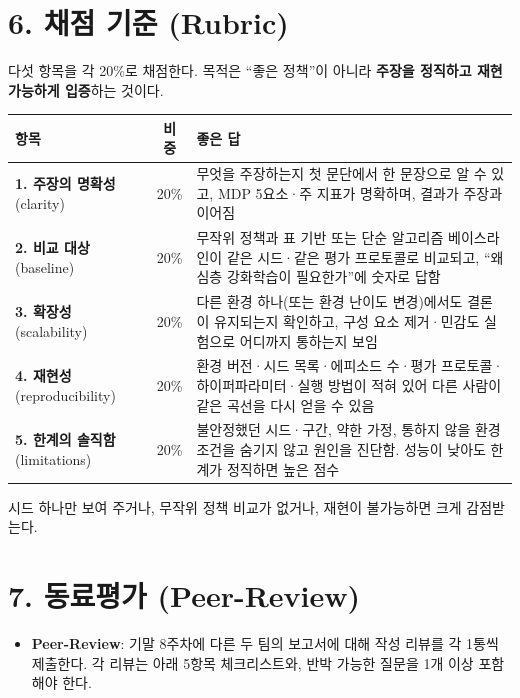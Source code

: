 \documentclass[12pt]{article}
\begin{document}
\section*{6. 채점 기준 (Rubric)}
다섯 항목을 각 20\%로 채점한다. 목적은 ``좋은 정책''이 아니라 \textbf{주장을 정직하고 재현 가능하게 입증}하는 것이다.
\begin{center}
\small
\begin{tabular}{@{}p{3.3cm}cp{7.4cm}@{}}
\toprule
항목 & 비중 & 좋은 답 \\
\midrule
\textbf{1. 주장의 명확성} (clarity) & 20\% & 무엇을 주장하는지 첫 문단에서 한 문장으로 알 수 있고, MDP 5요소·주 지표가 명확하며, 결과가 주장과 이어짐 \\
\textbf{2. 비교 대상} (baseline) & 20\% & 무작위 정책과 표 기반 또는 단순 알고리즘 베이스라인이 같은 시드·같은 평가 프로토콜로 비교되고, ``왜 심층 강화학습이 필요한가''에 숫자로 답함 \\
\textbf{3. 확장성} (scalability) & 20\% & 다른 환경 하나(또는 환경 난이도 변경)에서도 결론이 유지되는지 확인하고, 구성 요소 제거·민감도 실험으로 어디까지 통하는지 보임 \\
\textbf{4. 재현성} (reproducibility) & 20\% & 환경 버전·시드 목록·에피소드 수·평가 프로토콜·하이퍼파라미터·실행 방법이 적혀 있어 다른 사람이 같은 곡선을 다시 얻을 수 있음 \\
\textbf{5. 한계의 솔직함} (limitations) & 20\% & 불안정했던 시드·구간, 약한 가정, 통하지 않을 환경 조건을 숨기지 않고 원인을 진단함. 성능이 낮아도 한계가 정직하면 높은 점수 \\
\bottomrule
\end{tabular}
\end{center}
\vspace{4pt}
시드 하나만 보여 주거나, 무작위 정책 비교가 없거나, 재현이 불가능하면 크게 감점받는다.

\newpage
\section*{7. 동료평가 (Peer-Review)}
\begin{itemize}
\item \textbf{Peer-Review}: 기말 8주차에 다른 두 팀의 보고서에 대해 작성 리뷰를 각 1통씩 제출한다. 각 리뷰는 아래 5항목 체크리스트와, 반박 가능한 질문을 1개 이상 포함해야 한다.
\end{itemize}
\end{document}
